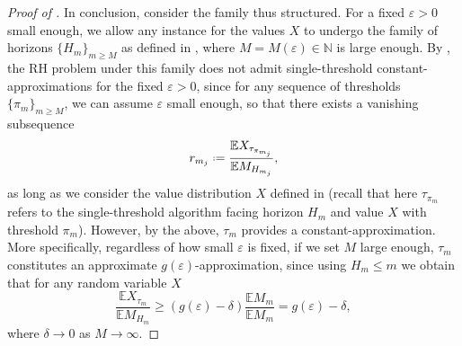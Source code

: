 \documentclass[11pt, a4paper, twoside]{article}
\newcommand*{\defeq}{\mathrel{\vcenter{\baselineskip0.5ex \lineskiplimit0pt
			\hbox{\scriptsize.}\hbox{\scriptsize.}}}=}
\newcommand{\eps}{\varepsilon}
\newcommand{\NN}{\mathbb{N}}
\newcommand{\EE}{\mathbb{E}}
\numberwithin{equation}{section}
\begin{document}
\begin{proof}[Proof of ]
		In conclusion, consider the family thus structured. For a fixed $\eps>0$ small enough, we allow any instance for the values $X$ to undergo the family of horizons $\{H_m\}_{m\ge M}$ as defined in , where $M=M(\eps)\in\NN$ is large enough. By , the RH problem under this family does not admit single-threshold constant-approximations for the fixed $\eps>0$, since for any sequence of thresholds $\{\pi_m\}_{m\ge M}$, we can assume $\eps$ small enough, so that there exists a vanishing subsequence \[r_{m_j}\defeq\frac{\EE X_{\tau_{\pi_{m_j}}}}{\EE M_{H_{m_j}}},\] as long as we consider the value distribution $X$ defined in  (recall that here $\tau_{\pi_m}$ refers to the single-threshold algorithm facing horizon $H_m$ and value $X$ with threshold $\pi_m$). However, by the above, $\tau_m$ provides a constant-approximation. More specifically, regardless of how small $\eps$ is fixed, if we set $M$ large enough, $\tau_m$ constitutes an approximate $g(\eps)$-approximation, since using $H_m\le m$ we obtain that for any random variable $X$
		\[\frac{\EE X_{\tau_m}}{\EE M_{H_m}}\ge (g(\eps)-\delta)\frac{\EE M_m}{\EE M_m}=g(\eps)-\delta,\]
		where $\delta\longrightarrow 0$ as $M\longrightarrow\infty$.
	\end{proof}
	
\end{document}
